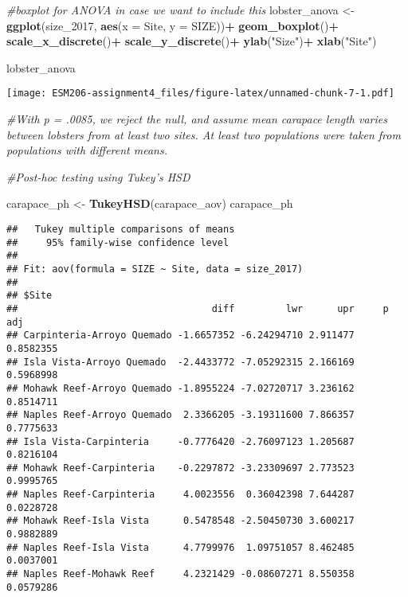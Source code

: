 \documentclass[]{article}
\newenvironment{Shaded}{\begin{snugshade}}{\end{snugshade}}
\newcommand{\KeywordTok}[1]{\textcolor[rgb]{0.13,0.29,0.53}{\textbf{#1}}}
\newcommand{\DataTypeTok}[1]{\textcolor[rgb]{0.13,0.29,0.53}{#1}}
\newcommand{\DecValTok}[1]{\textcolor[rgb]{0.00,0.00,0.81}{#1}}
\newcommand{\StringTok}[1]{\textcolor[rgb]{0.31,0.60,0.02}{#1}}
\newcommand{\CommentTok}[1]{\textcolor[rgb]{0.56,0.35,0.01}{\textit{#1}}}
\newcommand{\OperatorTok}[1]{\textcolor[rgb]{0.81,0.36,0.00}{\textbf{#1}}}
\newcommand{\NormalTok}[1]{#1}
\begin{document}
\begin{Shaded}
\begin{Highlighting}[]
\CommentTok{#boxplot for ANOVA in case we want to include this}
\NormalTok{lobster_anova <-}\StringTok{ }\KeywordTok{ggplot}\NormalTok{(size_}\DecValTok{2017}\NormalTok{, }\KeywordTok{aes}\NormalTok{(}\DataTypeTok{x =}\NormalTok{ Site, }\DataTypeTok{y =}\NormalTok{ SIZE))}\OperatorTok{+}
\StringTok{  }\KeywordTok{geom_boxplot}\NormalTok{()}\OperatorTok{+}
\StringTok{  }\KeywordTok{scale_x_discrete}\NormalTok{()}\OperatorTok{+}
\StringTok{  }\KeywordTok{scale_y_discrete}\NormalTok{()}\OperatorTok{+}
\StringTok{  }\KeywordTok{ylab}\NormalTok{(}\StringTok{"Size"}\NormalTok{)}\OperatorTok{+}
\StringTok{  }\KeywordTok{xlab}\NormalTok{(}\StringTok{"Site"}\NormalTok{)}

\NormalTok{lobster_anova}
\end{Highlighting}
\end{Shaded}

\texttt{[image: ESM206-assignment4\_files/figure-latex/unnamed-chunk-7-1.pdf]}

\begin{Shaded}
\begin{Highlighting}[]
\CommentTok{#With p = .0085, we reject the null, and assume mean carapace length varies between lobsters from at least two sites. At least two populations were taken from populations with different means.}

\CommentTok{#Post-hoc testing using Tukey's HSD}

\NormalTok{carapace_ph <-}\StringTok{ }\KeywordTok{TukeyHSD}\NormalTok{(carapace_aov)}
\NormalTok{carapace_ph}
\end{Highlighting}
\end{Shaded}

\begin{verbatim}
##   Tukey multiple comparisons of means
##     95% family-wise confidence level
## 
## Fit: aov(formula = SIZE ~ Site, data = size_2017)
## 
## $Site
##                                  diff         lwr      upr     p adj
## Carpinteria-Arroyo Quemado -1.6657352 -6.24294710 2.911477 0.8582355
## Isla Vista-Arroyo Quemado  -2.4433772 -7.05292315 2.166169 0.5968998
## Mohawk Reef-Arroyo Quemado -1.8955224 -7.02720717 3.236162 0.8514711
## Naples Reef-Arroyo Quemado  2.3366205 -3.19311600 7.866357 0.7775633
## Isla Vista-Carpinteria     -0.7776420 -2.76097123 1.205687 0.8216104
## Mohawk Reef-Carpinteria    -0.2297872 -3.23309697 2.773523 0.9995765
## Naples Reef-Carpinteria     4.0023556  0.36042398 7.644287 0.0228728
## Mohawk Reef-Isla Vista      0.5478548 -2.50450730 3.600217 0.9882889
## Naples Reef-Isla Vista      4.7799976  1.09751057 8.462485 0.0037001
## Naples Reef-Mohawk Reef     4.2321429 -0.08607271 8.550358 0.0579286
\end{verbatim}
\end{document}
